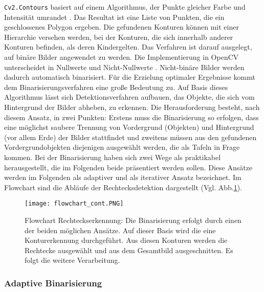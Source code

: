 \verb|Cv2.Contours| basiert auf einem Algorithmus, der Punkte gleicher Farbe und Intensität umrandet \cite{findcontours}. Das Resultat ist eine Liste von Punkten, die ein geschlossenes Polygon ergeben. Die gefundenen Konturen können mit einer Hierarchie versehen werden, bei der Konturen, die sich innerhalb anderer Konturen befinden, als deren \glqq Kinder\grqq gelten. Das Verfahren ist darauf ausgelegt, auf binäre Bilder angewendet zu werden. Die Implementierung in OpenCV unterscheidet in Nullwerte und Nicht-Nullwerte \cite{opencvcontours}. Nicht-binäre Bilder werden dadurch automatisch binarisiert. Für die Erzielung optimaler Ergebnisse kommt dem Binarisierungsverfahren eine große Bedeutung zu.
Auf Basis dieses Algorithmus lässt sich Detektionsverfahren aufbauen, das Objekte, die sich vom Hintergrund der Bilder abheben, zu erkennen. Die Herausforderung besteht, nach diesem Ansatz, in zwei Punkten: Erstens muss die Binarisierung so erfolgen, dass eine möglichst saubere Trennung von Vordergrund (Objekten) und Hintergrund (vor allem Erde) der Bilder stattfindet und zweitens müssen aus den gefundenen Vordergrundobjekten diejenigen ausgewählt werden, die als Tafeln in Frage kommen. Bei der Binarisierung haben sich zwei Wege als praktikabel herausgestellt, die im Folgenden beide präsentiert werden sollen. Diese Ansätze werden im Folgenden als adaptiver und als iterativer Ansatz bezeichnet. Im Flowchart sind die Abläufe der Rechtecksdetektion dargestellt (Vgl. Abb.\ref{fig:flowrectdetect}).
\begin{figure}[h!]
\centering
\texttt{[image: flowchart\_cont.PNG]}
\caption{Flowchart Rechteckserkennung: Die Binarisierung erfolgt durch einen der beiden möglichen Ansätze. Auf dieser Basis wird die eine Konturerkennung durchgeführt. Aus diesen Konturen werden die Rechtecke ausgewählt und aus dem Gesamtbild ausgeschnitten. Es folgt die weitere Verarbeitung.}
\label{fig:flowrectdetect}
\end{figure}

\subsubsection*{Adaptive Binarisierung}

